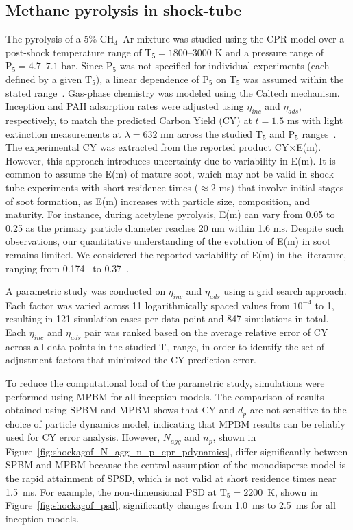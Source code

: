 \subsection{Methane pyrolysis in shock-tube}

The pyrolysis of a 5\% $\mathrm{CH_4}$–Ar mixture was studied using the CPR model over a post-shock temperature range of $\mathrm{T_5} = 1800$–$3000$ K and a pressure range of $\mathrm{P_5} = 4.7$–$7.1$ bar. Since $\mathrm{P_5}$ was not specified for individual experiments (each defined by a given $\mathrm{T_5}$), a linear dependence of $\mathrm{P_5}$ on $\mathrm{T_5}$ was assumed within the stated range~\citep{agafonov2016unified}. Gas-phase chemistry was modeled using the Caltech mechanism. Inception and PAH adsorption rates were adjusted using $\eta_{inc}$ and $\eta_{ads}$, respectively, to match the predicted Carbon Yield (CY) at $t = 1.5$ ms with light extinction measurements at $\lambda = 632$ nm across the studied $\mathrm{T_5}$ and $\mathrm{P_5}$ ranges~\citep{agafonov2016unified}. The experimental CY was extracted from the reported product CY$\times$E(m). However, this approach introduces uncertainty due to variability in E(m). It is common to assume the E(m) of mature soot, which may not be valid in shock tube experiments with short residence times ($\approx 2$ ms) that involve initial stages of soot formation, as E(m) increases with particle size, composition, and maturity. For instance, during acetylene pyrolysis, E(m) can vary from 0.05 to 0.25 as the primary particle diameter reaches 20 nm within 1.6 ms. Despite such observations, our quantitative understanding of the evolution of E(m) in soot remains limited. We considered the reported variability of E(m) in the literature, ranging from 0.174~\citep{lee1981optical} to 0.37~\citep{agafonov2011soot}.

A parametric study was conducted on $\eta_{inc}$ and $\eta_{ads}$ using a grid search approach. Each factor was varied across 11 logarithmically spaced values from $10^{-4}$ to 1, resulting in 121 simulation cases per data point and 847 simulations in total. Each $\eta_{inc}$ and $\eta_{ads}$ pair was ranked based on the average relative error of CY across all data points in the studied $\mathrm{T_5}$ range, in order to identify the set of adjustment factors that minimized the CY prediction error. 

To reduce the computational load of the parametric study, simulations were performed using MPBM for all inception models. The comparison of results obtained using SPBM and MPBM shows that CY and $d_p$ are not sensitive to the choice of particle dynamics model, indicating that MPBM results can be reliably used for CY error analysis. However, $N_{agg}$ and $n_p$, shown in Figure~\ref{fig:shockagof_N_agg_n_p_cpr_pdynamics}, differ significantly between SPBM and MPBM because the central assumption of the monodisperse model is the rapid attainment of SPSD, which is not valid at short residence times near 1.5~ms. For example, the non-dimensional PSD at $\mathrm{T_5}=2200$~K, shown in Figure~\ref{fig:shockagof_psd}, significantly changes from 1.0~ms to 2.5~ms for all inception models.

